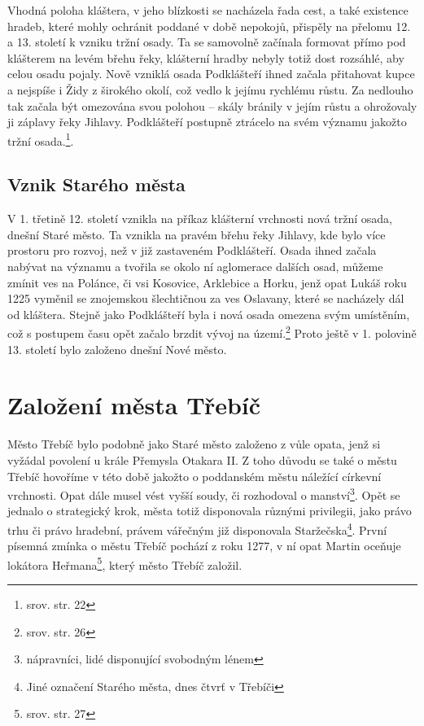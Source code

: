 \documentclass[a4paper,oneside,12pt]{report}
\begin{document}
Vhodná poloha kláštera, v jeho blízkosti se nacházela řada cest, a také existence hradeb, které mohly ochránit poddané v době nepokojů, přispěly na přelomu 12. a 13. století k vzniku tržní osady.
Ta se samovolně začínala formovat přímo pod klášterem na levém břehu řeky, klášterní hradby nebyly totiž dost rozsáhlé, aby celou osadu pojaly.
Nově vzniklá osada Podklášteří ihned začala přitahovat kupce a nejspíše i Židy z širokého okolí, což vedlo k jejímu rychlému růstu.
Za nedlouho tak začala být omezována svou polohou -- skály bránily v jejím růstu a ohrožovaly ji záplavy řeky Jihlavy.
Podklášteří postupně ztrácelo na svém významu jakožto tržní osada.\footnote{srov. \cite{Uhlir1978} str. 22}.

\subsection{Vznik Starého města}
V 1. třetině 12. století vznikla na příkaz klášterní vrchnosti nová tržní osada, dnešní Staré město.
Ta vznikla na pravém břehu řeky Jihlavy, kde bylo více prostoru pro rozvoj, než v již zastaveném Podklášteří.
Osada ihned začala nabývat na významu a tvořila se okolo ní aglomerace dalších osad, můžeme zmínit ves na Polánce, či vsi Kosovice, Arklebice a Horku, jenž opat Lukáš roku 1225 vyměnil se znojemskou šlechtičnou za ves Oslavany, které se nacházely dál od kláštera.
Stejně jako Podklášteří byla i nová osada omezena svým umístěním, což s postupem času opět začalo brzdit vývoj na území.\footnote{srov. \cite{Uhlir1978} str. 26}
Proto ještě v 1. polovině 13. století bylo založeno dnešní Nové město.


\section{Založení města Třebíč}
Město Třebíč bylo podobně jako Staré město založeno z vůle opata, jenž si vyžádal povolení u krále Přemysla Otakara II.
Z toho důvodu se také o městu Třebíč hovoříme v této době jakožto o poddanském městu náležící církevní vrchnosti.
Opat dále musel vést vyšší soudy, či rozhodoval o manství\footnote{nápravníci, lidé disponující svobodným lénem}.
Opět se jednalo o strategický krok, města totiž disponovala různými privilegii, jako právo trhu či právo hradební, právem vářečným již disponovala Staržečska\footnote{Jiné označení Starého města, dnes čtvrť v Třebíči}.
První písemná zmínka o městu Třebíč pochází z roku 1277, v ní opat Martin oceňuje lokátora Heřmana\footnote{srov. \cite{Uhlir1978} str. 27}, který město Třebíč založil.
\end{document}
